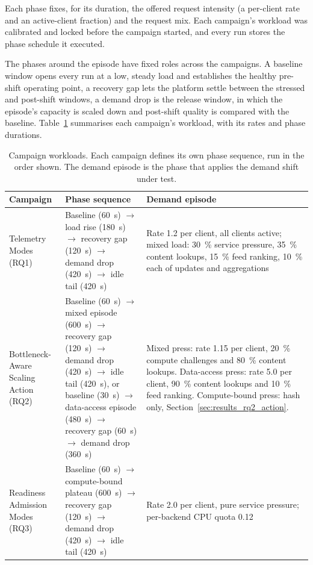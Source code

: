 ﻿\documentclass[12pt,reqno,twoside]{amsbook}
\begin{document}
Each phase fixes, for its duration, the offered request intensity (a per-client
rate and an active-client fraction) and the request mix. Each campaign's
workload was calibrated and locked before the campaign started, and every run
stores the phase schedule it executed.

The phases around the episode have fixed roles across the campaigns. A baseline
window opens every run at a low, steady load and establishes the healthy
pre-shift operating point, a recovery gap lets the platform settle between the
stressed and post-shift windows, a demand drop is the release window, in which
the episode's capacity is scaled down and post-shift quality is compared with
the baseline.
Table~\ref{tab:campaign_workloads} summarises each campaign's workload, with its
rates and phase durations.

\begin{table}[H]
    \centering
    \caption{Campaign workloads. Each campaign defines its own phase
    sequence, run in the order shown. The demand episode is the phase that
    applies the demand shift under test.}
    \label{tab:campaign_workloads}
    \footnotesize
    \begin{tabular}{p{} p{} p{}}
        \toprule
        Campaign & Phase sequence & Demand episode \\
        \midrule
        Telemetry Modes (RQ1) & Baseline (60~s) $\rightarrow$ load rise
        (180~s) $\rightarrow$ recovery gap (120~s) $\rightarrow$
        demand drop (420~s) $\rightarrow$ idle tail (420~s) & Rate 1.2 per
        client, all clients active; mixed load: 30~\% service pressure,
        35~\% content lookups, 15~\% feed ranking, 10~\% each of updates and
        aggregations \\
        Bottleneck-Aware Scaling Action (RQ2) & Baseline (60~s)
        $\rightarrow$ mixed episode (600~s) $\rightarrow$ recovery gap
        (120~s) $\rightarrow$ demand drop (420~s) $\rightarrow$ idle tail
        (420~s), or baseline (30~s) $\rightarrow$ data-access episode
        (480~s) $\rightarrow$ recovery gap (60~s) $\rightarrow$ demand drop
        (360~s) & Mixed press: rate 1.15 per client, 20~\% compute
        challenges and 80~\% content lookups. Data-access press: rate 5.0
        per client, 90~\% content lookups and 10~\% feed ranking.
        Compute-bound press: hash only, Section~\ref{sec:results_rq2_action}. \\
        Readiness Admission Modes (RQ3) & Baseline (60~s) $\rightarrow$
        compute-bound plateau (600~s) $\rightarrow$ recovery gap (120~s)
        $\rightarrow$ demand drop (420~s) $\rightarrow$ idle tail (420~s) &
        Rate 2.0 per client, pure service pressure; per-backend CPU quota
        0.12 \\
        \bottomrule
    \end{tabular}
\end{table}
\end{document}
